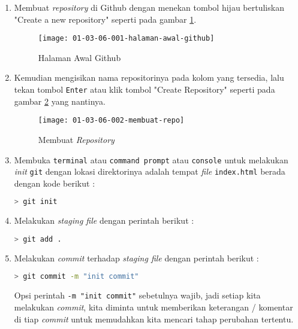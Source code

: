 \begin{enumerate}

	\item Membuat \textit{repository} di Github dengan menekan tombol hijau bertuliskan "Create a new repository" seperti pada gambar \ref{fig:01-03-06-001}.
	
	\begin{figure}[H]
		\centering
		\texttt{[image: 01-03-06-001-halaman-awal-github]}
		\caption{Halaman Awal Github}
		\label{fig:01-03-06-001}
	\end{figure}
	
	\item Kemudian mengisikan nama repositorinya pada kolom yang tersedia, lalu tekan tombol \texttt{Enter} atau klik tombol "Create Repository" seperti pada gambar \ref{fig:01-03-06-002} yang nantinya.
	
	\begin{figure}[H]
		\centering
		\texttt{[image: 01-03-06-002-membuat-repo]}
		\caption{Membuat \textit{Repository}}
		\label{fig:01-03-06-002}
	\end{figure}
	
	\item Membuka \texttt{terminal} atau \texttt{command prompt} atau \texttt{console} untuk melakukan \textit{init} \texttt{git} dengan lokasi direktorinya adalah tempat \textit{file} \texttt{index.html} berada dengan kode berikut :
	
	\begin{lstlisting}[language=bash]
> git init	\end{lstlisting}

	\item Melakukan \textit{staging file} dengan perintah berikut :
	
	\begin{lstlisting}[language=bash]
> git add . \end{lstlisting}

	\item Melakukan \textit{commit} terhadap \textit{staging file} dengan perintah berikut :
	
	\begin{lstlisting}[language=bash]
> git commit -m "init commit" \end{lstlisting}

	Opsi perintah \texttt{-m "init commit"} sebetulnya wajib, jadi setiap kita melakukan \textit{commit}, kita diminta untuk memberikan keterangan / komentar di tiap \textit{commit} untuk memudahkan kita mencari tahap perubahan tertentu.


\end{enumerate}
